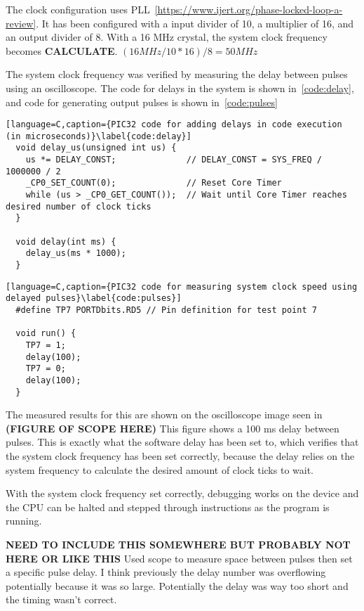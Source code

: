 The clock configuration uses PLL~\ref{https://www.ijert.org/phase-locked-loop-a-review}.
It has been configured with a input divider of 10, a multiplier of 16, and an output divider of 8.
With a 16 MHz crystal, the system clock frequency becomes \textbf{CALCULATE}.
\((16 MHz / 10 * 16) / 8 = 50 MHz\)

The system clock frequency was verified by measuring the delay between pulses using an oscilloscope.
The code for delays in the system is shown in~\autoref{code:delay}, and code for generating output pulses is shown in~\autoref{code:pulses}

\begin{lstlisting}[language=C,caption={PIC32 code for adding delays in code execution (in microseconds)}\label{code:delay}]
  void delay_us(unsigned int us) {
    us *= DELAY_CONST;              // DELAY_CONST = SYS_FREQ / 1000000 / 2
    _CP0_SET_COUNT(0);              // Reset Core Timer
    while (us > _CP0_GET_COUNT());  // Wait until Core Timer reaches desired number of clock ticks
  }

  void delay(int ms) {
    delay_us(ms * 1000);
  }
\end{lstlisting}

\begin{lstlisting}[language=C,caption={PIC32 code for measuring system clock speed using delayed pulses}\label{code:pulses}]
  #define TP7 PORTDbits.RD5 // Pin definition for test point 7

  void run() {
    TP7 = 1;
    delay(100);
    TP7 = 0;
    delay(100);
  }
\end{lstlisting}

The measured results for this are shown on the oscilloscope image seen in \textbf{(FIGURE OF SCOPE HERE)}
This figure shows a 100 ms delay between pulses.
This is exactly what the software delay has been set to, which verifies that the system clock frequency has been set correctly,
because the delay relies on the system frequency to calculate the desired amount of clock ticks to wait.

With the system clock frequency set correctly, debugging works on the device and the CPU can be halted and stepped through instructions as the program is running.

\textbf{NEED TO INCLUDE THIS SOMEWHERE BUT PROBABLY NOT HERE OR LIKE THIS}
Used scope to measure space between pulses then set a specific pulse delay.
I think previously the delay number was overflowing potentially because it was so large.
Potentially the delay was way too short and the timing wasn't correct.


